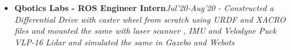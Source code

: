 \documentclass{article}
\begin{document}
\begin{itemize}
    \item{\textbf{\large{Qbotics Labs - ROS Engineer Intern}}}\hfill \textit{Jul'20-Aug'20}
          \newline
          \textit{- Constructed a Differential Drive with caster wheel from scratch using URDF and XACRO files and mounted the same with laser scanner , IMU and Velodyne Puck VLP-16 Lidar and simulated the same in Gazebo and Webots}
\end{itemize}
\end{document}
